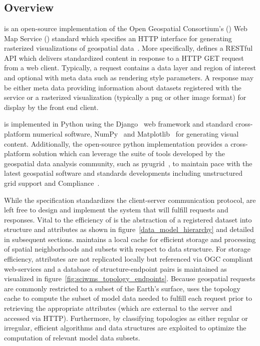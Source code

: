 \section{\sciwms{}}
\label{sec:sciwms}

\subsection{Overview}
\Sciwms{} is an open-source implementation of the Open Geospatial
Consortium's (\ogc{}) Web Map Service (\wms{}) standard which
specifies an HTTP interface for generating rasterized visualizations
of geospatial data~\cite{wms14}. More specifically, \wms{} defines a
RESTful API which delivers standardized content in response to a HTTP
GET request from a web client. Typically, a \wms{} request contains a
data layer and region of interest and optional with meta data such as
rendering style parameters. A \wms{} response may be either meta data
providing information about datasets registered with the \wms{}
service or a rasterized visualization (typically a png or other image
format) for display by the front end client.

\sciwms{} is implemented in Python using the Django~\cite{django} web
framework and standard cross-platform numerical software,
NumPy~\cite{numpy11} and Matplotlib~\cite{hunter07} for generating
visual content. Additionally, the open-source python implementation
provides a cross-platform \wms{} solution which can leverage the suite
of tools developed by the geospatial data analysis community, such as
pyugrid~\cite{pyugrid}, to maintain pace with the latest geospatial
software and standards developments including unstructured grid
support and \cfugrid{} Compliance~\cite{cfugrid}.

While the \ogc{} \wms{} specification standardizes the client-server
communication protocol, \wms{} are left free to design and implement
the system that will fulfill \wms{} requests and responses. Vital to
the efficiency of \sciwms{} is the abstraction of a registered dataset
into structure and attributes as shown in
figure~\ref{data_model_hierarchy} and detailed in subsequent
sections. \Sciwms{} maintains a local cache for efficient storage and
processing of spatial neighborhoods and subsets with respect to data
structure. For storage efficiency, attributes are not replicated
locally but referenced via OGC compliant web-services and a database
of structure-endpoint pairs is maintained as visualized in
figure~\ref{fig:sciwms_topology_endpoints}. Because geospatial \wms{}
requests are commonly restricted to a subset of the Earth's surface,
\sciwms{} uses the topology cache to compute the subset of model data
needed to fulfill each request prior to retrieving the appropriate
attributes (which are external to the \sciwms{} server and accessed via
HTTP). Furthermore, by classifying topologies as either regular or
irregular, efficient algorithms and data structures are exploited to
optimize the computation of relevant model data subsets.

